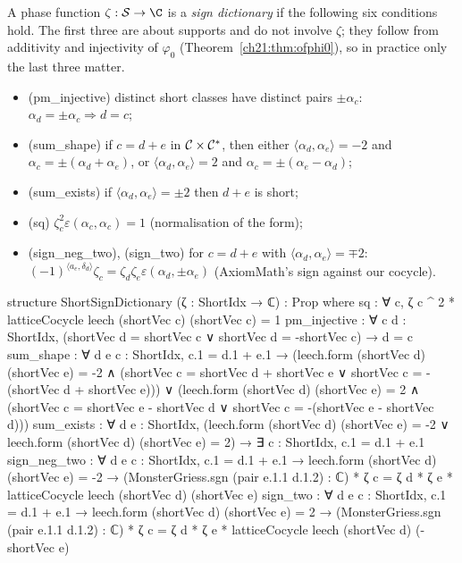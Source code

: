 \begin{definition}\label{ch21:def:ssd}
A phase function $\zeta:\chXXIS\to\C$ is a \emph{sign dictionary} if the following six conditions hold.
The first three are about supports and do not involve $\zeta$; they follow from additivity and
injectivity of $\varphi_0$ (Theorem~\ref{ch21:thm:ofphi0}), so in practice only the last three matter.
\begin{itemize}
\item (pm\_injective) distinct short classes have distinct pairs $\pm\alpha_c$: $\alpha_d=\pm\alpha_c\Rightarrow d=c$;
\item (sum\_shape) if $c=d+e$ in $\mathcal{C}\times\mathcal{C}^*$, then either $\langle\alpha_d,\alpha_e\rangle=-2$ and
  $\alpha_c=\pm(\alpha_d+\alpha_e)$, or $\langle\alpha_d,\alpha_e\rangle=2$ and $\alpha_c=\pm(\alpha_e-\alpha_d)$;
\item (sum\_exists) if $\langle\alpha_d,\alpha_e\rangle=\pm2$ then $d+e$ is short;
\item (sq) $\zeta_c^2\varepsilon(\alpha_c,\alpha_c)=1$ (normalisation of the form);
\item (sign\_neg\_two), (sign\_two) for $c=d+e$ with $\langle\alpha_d,\alpha_e\rangle=\mp2$:
  $(-1)^{\langle a_e,\delta_d\rangle}\zeta_c=\zeta_d\zeta_e\varepsilon(\alpha_d,\pm\alpha_e)$ (AxiomMath's sign
  against our cocycle).
\end{itemize}
\end{definition}
\begin{leancode}
structure ShortSignDictionary (ζ : ShortIdx → ℂ) : Prop where
  sq : ∀ c, ζ c ^ 2 * latticeCocycle leech (shortVec c) (shortVec c) = 1
  pm_injective : ∀ c d : ShortIdx, (shortVec d = shortVec c ∨ shortVec d = -shortVec c) → d = c
  sum_shape : ∀ d e c : ShortIdx, c.1 = d.1 + e.1 →
    (leech.form (shortVec d) (shortVec e) = -2 ∧
      (shortVec c = shortVec d + shortVec e ∨ shortVec c = -(shortVec d + shortVec e))) ∨
    (leech.form (shortVec d) (shortVec e) = 2 ∧
      (shortVec c = shortVec e - shortVec d ∨ shortVec c = -(shortVec e - shortVec d)))
  sum_exists : ∀ d e : ShortIdx, (leech.form (shortVec d) (shortVec e) = -2 ∨
    leech.form (shortVec d) (shortVec e) = 2) → ∃ c : ShortIdx, c.1 = d.1 + e.1
  sign_neg_two : ∀ d e c : ShortIdx, c.1 = d.1 + e.1 → leech.form (shortVec d) (shortVec e) = -2 →
    (MonsterGriess.sgn (pair e.1.1 d.1.2) : ℂ) * ζ c = ζ d * ζ e * latticeCocycle leech (shortVec d) (shortVec e)
  sign_two : ∀ d e c : ShortIdx, c.1 = d.1 + e.1 → leech.form (shortVec d) (shortVec e) = 2 →
    (MonsterGriess.sgn (pair e.1.1 d.1.2) : ℂ) * ζ c = ζ d * ζ e * latticeCocycle leech (shortVec d) (-shortVec e)
\end{leancode}
